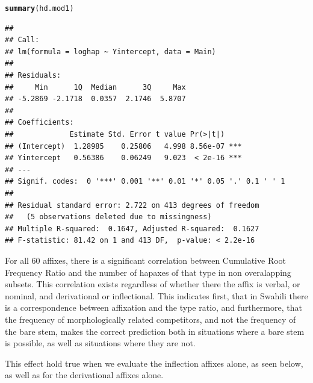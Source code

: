 \documentclass[12pt]{article}\usepackage[]{graphicx}\usepackage[]{color}
\makeatletter
\newcommand{\hlstd}[1]{\textcolor[rgb]{0.345,0.345,0.345}{#1}}%
\newcommand{\hlkwd}[1]{\textcolor[rgb]{0.737,0.353,0.396}{\textbf{#1}}}%
\newenvironment{kframe}{%
 \def\at@end@of@kframe{}%
 \ifinner\ifhmode%
  \def\at@end@of@kframe{\end{minipage}}%
  \begin{minipage}{\columnwidth}%
 \fi\fi%
 \def\FrameCommand##1{\hskip\@totalleftmargin \hskip-\fboxsep
 \colorbox{shadecolor}{##1}\hskip-\fboxsep
     \hskip-\linewidth \hskip-\@totalleftmargin \hskip\columnwidth}%
 \MakeFramed {\advance\hsize-\width
   \@totalleftmargin\z@ \linewidth\hsize
   \@setminipage}}%
 {\par\unskip\endMakeFramed%
 \at@end@of@kframe}
\newenvironment{knitrout}{}{} %
\makeatother
\begin{document}
\begin{knitrout}
\begin{kframe}\begin{alltt}
\hlkwd{summary}\hlstd{(hd.mod1)}
\end{alltt}
\begin{verbatim}
## 
## Call:
## lm(formula = loghap ~ Yintercept, data = Main)
## 
## Residuals:
##     Min      1Q  Median      3Q     Max 
## -5.2869 -2.1718  0.0357  2.1746  5.8707 
## 
## Coefficients:
##             Estimate Std. Error t value Pr(>|t|)    
## (Intercept)  1.28985    0.25806   4.998 8.56e-07 ***
## Yintercept   0.56386    0.06249   9.023  < 2e-16 ***
## ---
## Signif. codes:  0 '***' 0.001 '**' 0.01 '*' 0.05 '.' 0.1 ' ' 1
## 
## Residual standard error: 2.722 on 413 degrees of freedom
##   (5 observations deleted due to missingness)
## Multiple R-squared:  0.1647,	Adjusted R-squared:  0.1627 
## F-statistic: 81.42 on 1 and 413 DF,  p-value: < 2.2e-16
\end{verbatim}
\end{kframe}
\end{knitrout}
For all 60 affixes, there is a significant correlation between Cumulative Root Frequency Ratio and the number of hapaxes of that type in non overalapping subsets. This correlation exists regardless of whether there the affix is verbal, or nominal, and derivational or inflectional. This indicates first, that in Swahili there is a correspondence between affixation and the type ratio, and furthermore, that the frequency of morphologically related competitors, and not the frequency of the bare stem, makes the correct prediction both in situations where a bare stem is possible, as well as situations where they are not.

This effect hold true when we evaluate the inflection affixes alone, as seen below, as well as for the derivational affixes alone.
\end{document}
